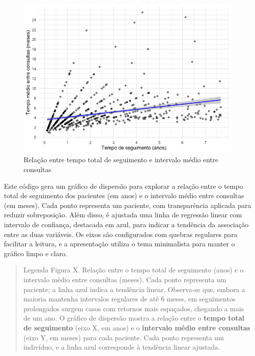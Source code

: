 \documentclass[
]{article}
\begin{document}
\begin{figure}[H]

{\centering \includegraphics[width=1\textwidth,height=\textheight]{outputs/figs/seguimento-vs-intervalo-1.png}

}

\caption{Relação entre tempo total de seguimento e intervalo médio entre
consultas}

\end{figure}%

Este código gera um gráfico de dispersão para explorar a relação entre o
tempo total de seguimento dos pacientes (em anos) e o intervalo médio
entre consultas (em meses). Cada ponto representa um paciente, com
transparência aplicada para reduzir sobreposição. Além disso, é ajustada
uma linha de regressão linear com intervalo de confiança, destacada em
azul, para indicar a tendência da associação entre as duas variáveis. Os
eixos são configurados com quebras regulares para facilitar a leitura, e
a apresentação utiliza o tema minimalista para manter o gráfico limpo e
claro.

\begin{quote}
Legenda Figura X. Relação entre o tempo total de seguimento (anos) e o
intervalo médio entre consultas (meses). Cada ponto representa um
paciente; a linha azul indica a tendência linear. Observa-se que, embora
a maioria mantenha intervalos regulares de até 6 meses, em seguimentos
prolongados surgem casos com retornos mais espaçados, chegando a mais de
um ano. O gráfico de dispersão mostra a relação entre o \textbf{tempo
total de seguimento} (eixo X, em anos) e o \textbf{intervalo médio entre
consultas} (eixo Y, em meses) para cada paciente. Cada ponto representa
um indivíduo, e a linha azul corresponde à tendência linear ajustada.
\end{quote}
\end{document}
